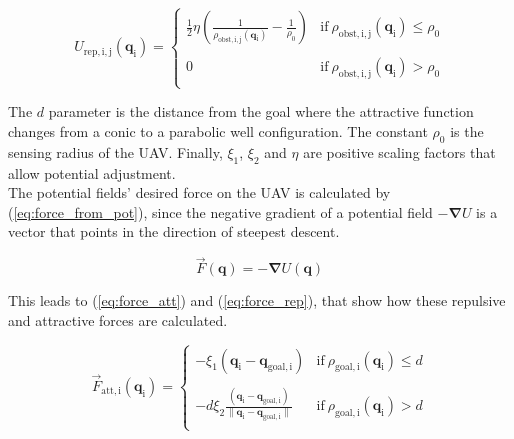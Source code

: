\documentclass[journal]{IEEEtran}
\newcommand*{\subb}[1]{_{\mathrm{#1}}}
\begin{document}
 		\begin{equation} \label{eq:pot_rep}
 		U\subb{rep, i,j}(\bm{q}\subb{i}) =  \left\lbrace  {\begin{array}{cc}
 			\frac{1}{2} \eta (\frac{1}{\rho\subb{obst,i,j}(\bm{q}\subb{i})} - \frac{1}{\rho\subb{0}}) &\textrm{if} \ \rho\subb{obst,i,j}(\bm{q}\subb{i})\leq \rho\subb{0} \\
 			\\
 			0 &\textrm{if} \ \rho\subb{obst,i,j}(\bm{q}\subb{i})> \rho\subb{0} \\
 			\end{array} } \right.
 		\end{equation}		
 		
	 The $d$ parameter is the distance from the goal where the attractive function changes from a conic to a parabolic well configuration. The constant $\rho\subb{0}$ is the sensing radius of the UAV. Finally, $\xi\subb{1}$, $\xi\subb{2}$ and $\eta$ are positive scaling factors that allow potential adjustment. \\
	
	The potential fields' desired force on the UAV is calculated by (\ref{eq:force_from_pot}), since the negative gradient of a potential field $-\bm{\nabla} U$ is a vector that points in the direction of steepest descent. 
	
	\begin{equation} \label{eq:force_from_pot}
		\vec{F}(\bm{q}) = - \bm{\nabla} U(\bm{q})
	\end{equation}
	
	This leads to (\ref{eq:force_att}) and (\ref{eq:force_rep}), that show how these repulsive and attractive forces are calculated.
	
	\begin{equation} \label{eq:force_att}
		\vec{F}\subb{att, i}(\bm{q}\subb{i}) =  \left\lbrace  {\begin{array}{cc}
			- \xi\subb{1} (\bm{q}\subb{i}-\bm{q}\subb{goal, i})& \textrm{if} \ \rho\subb{goal, i}(\bm{q}\subb{i})\leq d \\
			\\
			-d \xi\subb{2} \frac{(\bm{q}\subb{i}-\bm{q}\subb{goal, i})}{\parallel\bm{q}\subb{i}-\bm{q}\subb{goal,i}\parallel}&\textrm{if} \ \rho\subb{goal, i}(\bm{q}\subb{i})> d \\
			\end{array} } \right.
	\end{equation}
\end{document}

